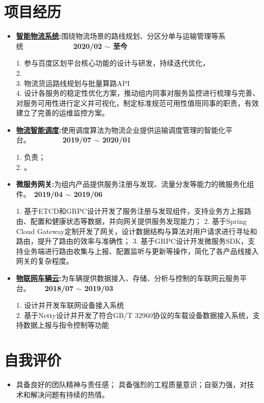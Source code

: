 \documentclass[letterpaper, UTF8, 11pt]{article}
\begin{document}
	\section*{\textbf{项目经历}}\vspace{-0.12in}
	\begin{itemize}	
		\item \textbf{\href{https://lbsyun.baidu.com/solutions/logisticsmap}{智能物流系统}:}{围绕物流场景的路线规划、分区分单与运输管理等系统}~~~~~~~~~~~~~~\textbf{2020/02 $\sim$ 至今}
		
		1. 参与百度区划平台核心功能的设计与研发，持续迭代优化，\\
		2. \\
		3. 物流货运路线规划与批量算路API \\
		4. 设计各服务的稳定性优化方案，推动组内同事对服务监控进行梳理与完善、对服务可用性进行定义并可视化，制定标准规范可用性值班同事的职责，有效建立了完善的运维监控方案。
		
		\vspace{0.03in}

		\item \textbf{\href{https://lbsyun.baidu.com/solutions/scheduling}{物流智能调度}:}{使用调度算法为物流企业提供运输调度管理的智能化平台。}~~~~~~~~~\textbf{2019/07 $\sim$ 2020/01}
		
		1. 负责\textbf{}；\\
		2. 。
		
		\vspace{0.03in}

		\item \textbf{微服务网关:}{为组内产品提供服务注册与发现、流量分发等能力的微服务化组件。}~\textbf{2019/04 $\sim$ 2019/06}
		
		1. 基于ETCD和GRPC设计开发了服务注册与发现组件，支持业务方上报路由、配置和健康状态等数据，并向网关提供服务发现能力；
		2. 基于Spring Cloud Gateway定制开发了网关，设计数据结构与算法对用户请求进行寻址和路由，提升了路由的效率与准确性；
		3. 基于GRPC设计开发微服务SDK，支持业务端进行路由收集与上报、配置监听与更新等操作，简化了各产品线接入网关的复杂程度。
		
		\vspace{0.03in}
		
		\item \textbf{\href{https://cloud.baidu.com/product/dugo.html}{物联网车辆云}:}{为车辆提供数据接入、存储、分析与控制的车联网云服务平台。}~~~~\textbf{2018/07 $\sim$ 2019/03}
		
		1. 设计并开发车联网设备接入系统\\
		2. 基于Netty设计并开发了符合GB/T 32960协议的车载设备数据接入系统，支持数据上报与指令控制等功能
		
		\vspace{0.03in}
		
	\end{itemize}
	\vspace{-0.32in}
	
	\section*{\textbf{自我评价}}\vspace{-0.12in}
	\begin{itemize}	
		\item 具备良好的团队精神与责任感；
		具备强烈的工程质量意识；自驱力强，对技术和解决问题有持续的热情。
	\end{itemize}
	\vspace{-0.32in}
\end{document}
